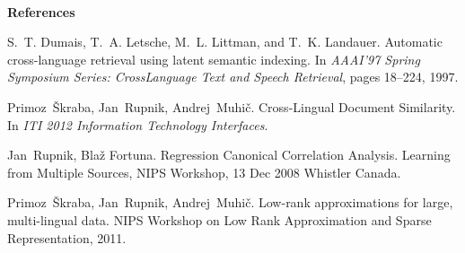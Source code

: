 \documentclass[twocolumn, draft]{article}
\begin{document}
\ \\
 \textbf{\large References} \vspace*{1.3ex}  \begin{list}{[]}
  {\setlength{\leftmargin}{0.5cm}
   \setlength{\parsep}{0pt}\setlength{\itemsep}{2pt}
   \setlength{\labelsep}{0.1cm}}


S.~T. Dumais, T.~A. Letsche, M.~L. Littman, and T.~K. Landauer.
\newblock Automatic cross-language retrieval using latent semantic indexing.
\newblock In {\em AAAI'97 Spring Symposium Series: CrossLanguage Text and
  Speech Retrieval}, pages 18--224, 1997.

Primoz~\v Skraba, Jan~Rupnik, Andrej~Muhi\v c.
\newblock Cross-Lingual Document Similarity.
\newblock In {\em ITI 2012 Information Technology Interfaces}.

Jan~Rupnik, Bla\v z Fortuna.
\newblock Regression Canonical Correlation Analysis.
\newblock Learning from Multiple Sources, NIPS Workshop, 13 Dec 2008 Whistler Canada.

Primoz~\v Skraba, Jan~Rupnik, Andrej~Muhi\v c.
\newblock Low-rank approximations for large, multi-lingual data.
\newblock NIPS Workshop on Low Rank Approximation and Sparse Representation, 2011.
\end{list}
\end{document}
